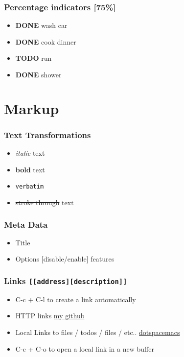 \documentclass[11pt]{article}
\begin{document}
\subsubsection*{Percentage indicators [75\%]}
\label{sec:org4d21d18}
\begin{itemize}
\item {\bfseries\sffamily DONE} wash car
\label{sec:org8431209}
\item {\bfseries\sffamily DONE} cook dinner
\label{sec:org9f8fb50}
\item {\bfseries\sffamily TODO} run
\label{sec:org137f0b3}
\item {\bfseries\sffamily DONE} shower
\label{sec:org64102ee}
\end{itemize}

\section*{Markup}
\label{sec:org851b625}
\subsubsection*{Text Transformations}
\label{sec:org0680bed}
\begin{itemize}
\item \emph{italic} text
\item \textbf{bold} text
\item \texttt{verbatim}
\item \sout{stroke through} text
\end{itemize}
\subsubsection*{Meta Data}
\label{sec:orga16078f}
\begin{itemize}
\item Title
\item Options [disable/enable] features
\end{itemize}
\subsubsection*{Links \texttt{[[address][description]]}}
\label{sec:orga48f3cb}
\begin{itemize}
\item C-c + C-l to create a link automatically
\item HTTP links
\href{https://github.com//ryanLeulmi}{my github}
\item Local Links to files / todos / files / etc..
\href{file:///home/ryan/.spacemacs}{dotspacemacs}
\item C-c + C-o to open a local link in a new buffer
\end{itemize}
\end{document}
